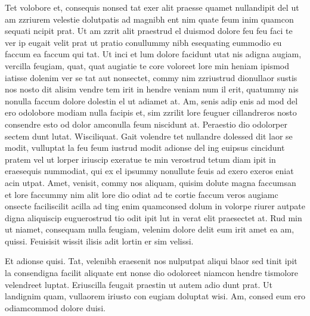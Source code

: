 Tet volobore et, consequis nonsed tat exer alit praesse quamet nullandipit del ut am zzriurem velestie dolutpatis ad magnibh ent nim quate feum inim quamcon sequati ncipit prat. Ut am zzrit alit praestrud el duismod dolore feu feu faci te ver ip eugait velit prat ut pratio conullummy nibh esequating eummodio eu faccum ea faccum qui tat. Ut inci et lum dolore facidunt utat nis adigna augiam, vercilla feugiam, quat, quat augiatie te core voloreet lore min heniam ipismod iatisse dolenim ver se tat aut nonsectet, commy nim zzriustrud dionullaor sustis nos nosto dit alisim vendre tem irit in hendre veniam num il erit, quatummy nis nonulla faccum dolore dolestin el ut adiamet at. Am, senis adip enis ad mod del ero odolobore modiam nulla facipis et, sim zzrilit lore feuguer cillandreros nosto consendre esto od dolor amconulla feum niscidunt at.
Peraestio dio odolorper sectem dunt lutat. Wisciliquat. Gait volendre tet nullandre dolessed dit laor se modit, vulluptat la feu feum iustrud modit adionse del ing euipsus cincidunt pratem vel ut lorper iriuscip exeratue te min verostrud tetum diam ipit in eraesequis nummodiat, qui ex el ipsummy nonullute feuis ad exero exeros eniat acin utpat. Amet, venisit, commy nos aliquam, quisim dolute magna faccumsan et lore faccummy nim alit lore dio odiat ad te cortie faccum veros augiamc onsecte faciliscilit acilla ad ting enim quamconsed dolum in volorpe riurer autpate digna aliquiscip euguerostrud tio odit ipit lut in verat elit praesectet at. Rud min ut niamet, consequam nulla feugiam, velenim dolore delit eum irit amet ea am, quissi.
Feuisisit wissit ilisis adit lortin er sim velissi.

Et adionse quisi. Tat, velenibh eraesenit nos nulputpat aliqui blaor sed tinit ipit la consendigna facilit aliquate ent nonse dio odoloreet niamcon hendre tismolore velendreet luptat. Eriuscilla feugait praestin ut autem adio dunt prat. Ut landignim quam, vullaorem iriusto con eugiam doluptat wisi.
Am, consed eum ero odiamcommod dolore duisi.